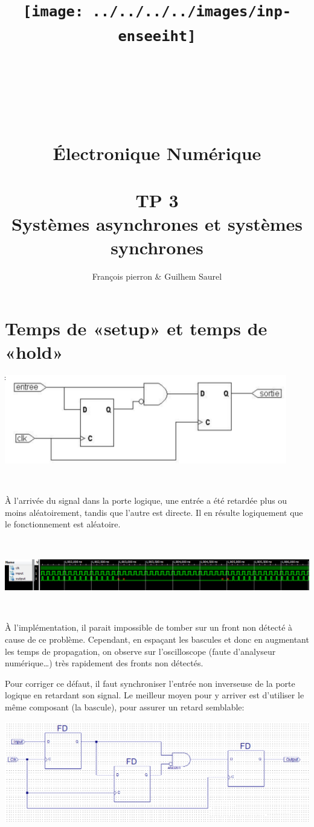 \documentclass{article}
\title{\texttt{[image: ../../../../images/inp-enseeiht]} \\ ~ \\ ~ \\ ~ \\ ~ \\ Électronique Numérique \\ ~ \\ TP 3 \\ 
Systèmes asynchrones et systèmes synchrones}
\author{François pierron \& Guilhem Saurel}
\date{\oldstylenums{\today}}
\begin{document}
\begin{titlepage}
    \setcounter{page}{0}
    \maketitle
    \thispagestyle{empty}
    \tableofcontents
\end{titlepage}



\section{Temps de «setup» et temps de «hold»}
\includegraphics{I-circuit.png}

~

À l’arrivée du signal dans la porte logique, une entrée a été retardée plus ou moins aléatoirement, tandis que l’autre est directe. Il en résulte logiquement que le fonctionnement est aléatoire.

~

\includegraphics[width=\linewidth]{Setup_Hold_Post_Route.png}

~

À l’implémentation, il parait impossible de tomber sur un front non détecté à cause de ce problème. Cependant, en espaçant les bascules et donc en augmentant les temps de propagation, on observe sur l’oscilloscope (faute d’analyseur numérique…) très rapidement des fronts non détectés.

Pour corriger ce défaut, il faut synchroniser l’entrée non inverseuse de la porte logique en retardant son signal. Le meilleur moyen pour y arriver est d’utiliser le même composant (la bascule), pour assurer un retard semblable:

\includegraphics[width=\linewidth]{Setup_Hold_Synchronise.png}
\end{document}
